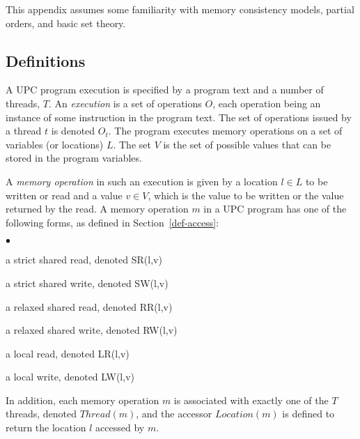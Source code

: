 \documentclass[12pt,titlepage]{article}
\newcounter{parnum}
\newcommand\np{\addtocounter{parnum}{1}\hspace{-2em}\makebox[2em][l]{\arabic{parnum}}}
\begin{document}
\np This appendix assumes some familiarity with memory consistency
models, partial orders, and basic set theory.

\subsection{Definitions}
\np A UPC program execution is specified by a program text and a
number of threads, $T$.  An \emph{execution} is a set of operations $O$,
each operation being an instance of some instruction in the program 
text.  The set of operations issued by a thread $t$ is denoted 
$O_t$.  The program executes memory operations on a set of 
variables (or locations) $L$.  The set $V$ is the set of 
possible values that can be stored in the program variables.

\np A \emph{memory operation} in such an execution is given by a location $l \in
L$ to be written or read and a value $v \in V$, which is the value to
be written or the value returned by the read.  A memory operation $m$
in a UPC program has one of the following forms, as defined in Section~\ref{def-access}:
\begin{list}{ $\bullet$ }{\setlength{\itemsep}{0pt}}
\item a strict shared read, denoted SR(l,v)
\item a strict shared write, denoted SW(l,v)
\item a relaxed shared read, denoted RR(l,v)
\item a relaxed shared write, denoted RW(l,v)
\item a local read, denoted LR(l,v)
\item a local write, denoted LW(l,v)
\end{list}

\np In addition, each memory operation $m$ is associated with exactly one 
of the $T$ threads, denoted $Thread(m)$, and the accessor $Location(m)$ 
is defined to return the location $l$ accessed by $m$.
\end{document}
